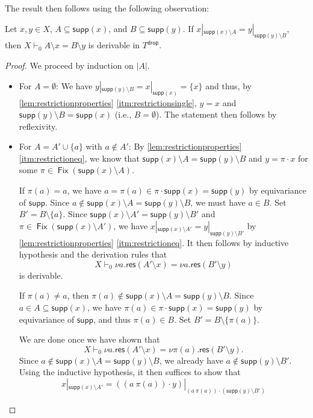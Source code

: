 \documentclass[a4paper,UKenglish,cleveref,thm-restate,numberwithinsect,final]{lipics-v2021}
\newcommand{\res}{\mathsf{res}}
\newcommand{\drop}{\mathsf{drop}}
\newcommand{\supp}{\mathsf{supp}}
\newcommand{\Fix}{\mathop{\mathsf{Fix}}}
\theoremstyle{plain}
\numberwithin{equation}{section}
\newcommand{\+}[1]{\mathcal{#1}\xspace}
\theoremstyle{definition}
\begin{document}
The result then follows using the following observation:
\begin{lemma}
  Let $x, y \in X$, $A \subseteq \supp(x)$, and $B \subseteq \supp(y)$.
  If $x|_{\supp(x) \setminus A} = y|_{\supp(y) \setminus B}$, then $X \vdash_0 A \setminus x = B \setminus y$ is derivable in $T^\drop$.
\end{lemma}
\begin{proof}
  We proceed by induction on $|A|$.
  \begin{itemize}
    \item
      For $A = \emptyset$:
      We have $y|_{\supp(y) \setminus B} = x|_{\supp(x)} = \{x\}$ and thus, by \cref{lem:restrictionproperties} \eqref{itm:restrictionsingle}, $y = x$ and $\supp(y) \setminus B = \supp(x)$ (i.e., $B = \emptyset$).
      The statement then follows by reflexivity.
    \item
      For $A = A' \cup \{a\}$ with $a\notin A'$: %
      By \cref{lem:restrictionproperties} \eqref{itm:restrictioneq}, we know that $\supp(x) \setminus A = \supp(y) \setminus B$ and $y = \pi \cdot x$ for some $\pi \in \Fix(\supp(x) \setminus A)$.

      If $\pi(a) = a$, we have $a = \pi(a) \in \pi \cdot \supp(x) = \supp(y)$ by equivariance of $\supp$.
      Since $a \notin \supp(x) \setminus A = \supp(y) \setminus B$, we must have $a \in B$.
      Set $B' = B \setminus \{a\}$.
      Since $\supp(x) \setminus A' = \supp(y) \setminus B'$ and $\pi \in \Fix(\supp(x) \setminus A')$, we have $x|_{\supp(x) \setminus A'} = y|_{\supp(y) \setminus B'}$ by \cref{lem:restrictionproperties} \eqref{itm:restrictioneq}.
      It then follows by inductive hypothesis and the derivation rules that
      \begin{equation*}
        X \vdash_0 \nu a.\res(A' \setminus x) = \nu a.\res(B' \setminus y)
      \end{equation*}
      is derivable.

      If $\pi(a) \neq a$, then $\pi(a) \notin \supp(x) \setminus A = \supp(y) \setminus B$.
      Since $a \in A \subseteq \supp(x)$, we have $\pi(a) \in \pi \cdot \supp(x) = \supp(y)$ by equivariance of $\supp$, and thus $\pi(a) \in B$.
      Set $B' = B \setminus \{\pi(a)\}$.

      We are done once we have shown that
      \begin{equation*}
        X \vdash_0 \nu a.\res(A' \setminus x) = \nu \pi(a).\res(B' \setminus y).
      \end{equation*}
      Since $a \notin \supp(x) \setminus A = \supp(y) \setminus B$, we already have $a \notin \supp(y) \setminus B'$.
      Using the inductive hypothesis, it then suffices to show that
      \begin{equation*}
        x|_{\supp(x) \setminus A'} = ((a\ \pi(a)) \cdot y)|_{(a\ \pi(a)) \cdot (\supp(y) \setminus B')}
      \end{equation*}


\end{itemize}
\end{proof}
\end{document}
